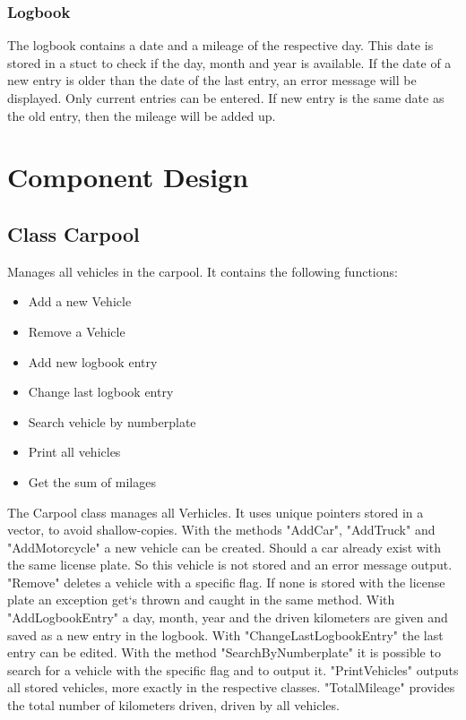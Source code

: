 \subsubsection{Logbook}
The logbook contains a date and a mileage of the respective day. This date is stored in a stuct to check if the day, month and year is available.
If the date of a new entry is older than the date of the last entry, an error message will be displayed. Only current entries can be entered. If new entry is the same date as the old entry, then the mileage will be added up.

\section{Component Design}
\subsection{Class Carpool}
Manages all vehicles in the carpool.
It contains the following functions:
\begin{itemize}
	\item Add a new Vehicle
	\item Remove a Vehicle
	\item Add new logbook entry
	\item Change last logbook entry
	\item Search vehicle by numberplate
	\item Print all vehicles
	\item Get the sum of milages
\end{itemize}

The Carpool class manages all Verhicles. It uses unique pointers stored in a vector, to avoid shallow-copies.
With the methods "AddCar", "AddTruck" and "AddMotorcycle" a new vehicle can be created. Should a car already exist with the same license plate. So this vehicle is not stored and an error message output.
"Remove" deletes a vehicle with a specific flag. If none is stored with the license plate an exception get`s thrown and caught in the same method.
With "AddLogbookEntry" a day, month, year and the driven kilometers are given and saved as a new entry in the logbook.
With "ChangeLastLogbookEntry" the last entry can be edited.
With the method "SearchByNumberplate" it is possible to search for a vehicle with the specific flag and to output it.
"PrintVehicles" outputs all stored vehicles, more exactly in the respective classes.
"TotalMileage" provides the total number of kilometers driven, driven by all vehicles.

